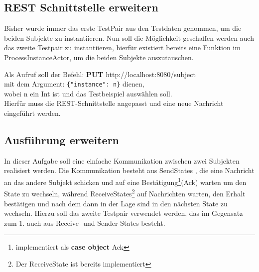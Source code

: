 \documentclass[11pt]{tudexercise}
\begin{document}
  \subsection{REST Schnittstelle erweitern}
    Bisher wurde immer das erste TestPair aus den Testdaten genommen, um die beiden Subjekte zu instantiieren.
    Nun soll die Möglichkeit geschaffen werden auch das zweite Testpair zu instantiieren,
    hierfür existiert bereits eine Funktion im ProcessInstanceActor,
    um die beiden Subjekte auszutauschen.

    Als Aufruf soll der Befehl:
    \textbf{PUT} http://localhost:8080/subject\\
    mit dem Argument: \verb|{"instance": n}| dienen,\\
    wobei n ein Int ist und das Testbeispiel auswählen soll.\\
    Hierfür muss die REST-Schnittstelle angepasst und eine neue Nachricht eingeführt werden.

  \subsection{Ausführung erweitern}
    In dieser Aufgabe soll eine einfache Kommunikation zwischen zwei Subjekten realisiert werden.
    Die Kommunikation besteht aus SendStates , die eine Nachricht an das andere Subjekt schicken
    und auf eine Bestätigung\footnote{implementiert als \textbf{case object} Ack}(Ack) warten um den State zu wechseln,
    während ReceiveStates\footnote{Der ReceiveState ist bereits implementiert}
    auf Nachrichten warten, den Erhalt bestätigen und nach dem dann in der Lage sind
    in den nächsten State zu wechseln. Hierzu soll das zweite Testpair verwendet werden,
    das im Gegensatz zum 1. auch aus Receive- und Sender-States besteht.
\end{document}
